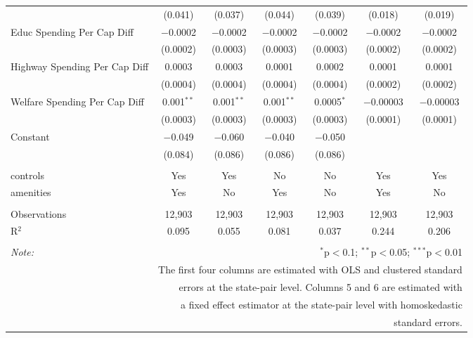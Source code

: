 \begin{table}[!htbp]
\begin{tabular}{@{\extracolsep{5pt}}lcccccc}
  & (0.041) & (0.037) & (0.044) & (0.039) & (0.018) & (0.019) \\ 
  Educ Spending Per Cap Diff & $-$0.0002 & $-$0.0002 & $-$0.0002 & $-$0.0002 & $-$0.0002 & $-$0.0002 \\ 
  & (0.0002) & (0.0003) & (0.0003) & (0.0003) & (0.0002) & (0.0002) \\ 
  Highway Spending Per Cap Diff & 0.0003 & 0.0003 & 0.0001 & 0.0002 & 0.0001 & 0.0001 \\ 
  & (0.0004) & (0.0004) & (0.0004) & (0.0004) & (0.0002) & (0.0002) \\ 
  Welfare Spending Per Cap Diff & 0.001$^{**}$ & 0.001$^{**}$ & 0.001$^{**}$ & 0.0005$^{*}$ & $-$0.00003 & $-$0.00003 \\ 
  & (0.0003) & (0.0003) & (0.0003) & (0.0003) & (0.0001) & (0.0001) \\ 
  Constant & $-$0.049 & $-$0.060 & $-$0.040 & $-$0.050 &  &  \\ 
  & (0.084) & (0.086) & (0.086) & (0.086) &  &  \\ 
 \hline \\[-1.8ex] 
controls & Yes & Yes & No & No & Yes & Yes \\ 
amenities & Yes & No & Yes & No & Yes & No \\ 
\hline \\[-1.8ex] 
Observations & 12,903 & 12,903 & 12,903 & 12,903 & 12,903 & 12,903 \\ 
R$^{2}$ & 0.095 & 0.055 & 0.081 & 0.037 & 0.244 & 0.206 \\ 
\hline 
\hline \\[-1.8ex] 
\textit{Note:}  & \multicolumn{6}{r}{$^{*}$p$<$0.1; $^{**}$p$<$0.05; $^{***}$p$<$0.01} \\ 
 & \multicolumn{6}{r}{The first four columns are estimated with OLS and clustered standard} \\ 
 & \multicolumn{6}{r}{ errors at the state-pair level. Columns 5 and 6 are estimated with} \\ 
 & \multicolumn{6}{r}{a fixed effect estimator at the state-pair level with homoskedastic} \\ 
 & \multicolumn{6}{r}{standard errors.} \\ 
\end{tabular} 
\end{table} 
